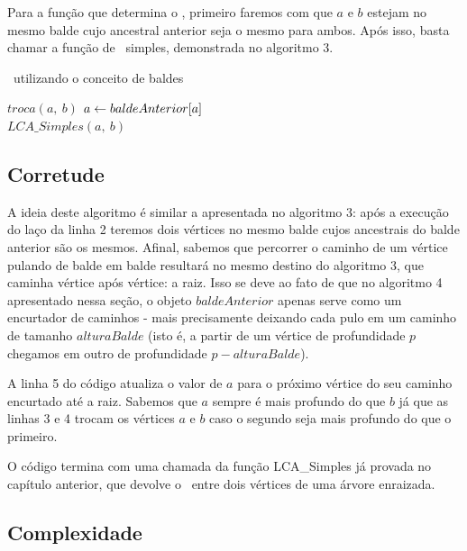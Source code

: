 Para a função que determina o \LCA, primeiro faremos com que $a$ e $b$ estejam no mesmo balde cujo ancestral anterior seja o mesmo para ambos. Após isso, basta chamar a função de \LCA\ simples, demonstrada no algoritmo 3.

\begin{algorithm}[H]
\caption{\LCA\ utilizando o conceito de baldes}
\begin{algorithmic}[1]
            \State $troca(a,\ b)$
        \State $a \leftarrow baldeAnterior[a]$
        \EndIf
    \EndWhile
    \\\hspace{5mm} \Return $LCA\_Simples(a,\ b)$
\EndFunction
\end{algorithmic}
\end{algorithm}

\subsection{Corretude}

A ideia deste algoritmo é similar a apresentada no algoritmo 3: após a execução do laço da linha 2 teremos dois vértices no mesmo balde cujos ancestrais do balde anterior são os mesmos. Afinal, sabemos que percorrer o caminho de um vértice pulando de balde em balde resultará no mesmo destino do algoritmo 3, que caminha vértice após vértice: a raiz. Isso se deve ao fato de que no algoritmo 4 apresentado nessa seção, o objeto $baldeAnterior$ apenas serve como um encurtador de caminhos - mais precisamente deixando cada pulo em um caminho de  tamanho $alturaBalde$ (isto é, a partir de um vértice de profundidade $p$ chegamos em outro de profundidade $p - alturaBalde$).

A linha 5 do código atualiza o valor de $a$ para o próximo vértice do seu caminho encurtado até a raiz. Sabemos que $a$ sempre é mais profundo do que $b$ já que as linhas 3 e 4 trocam os vértices $a$ e $b$ caso o segundo seja mais profundo do que o primeiro.

O código termina com uma chamada da função LCA\_Simples já provada no capítulo anterior, que devolve o \LCA\ entre dois vértices de uma árvore enraizada.

\subsection{Complexidade}
\label{complexidade-balde}

